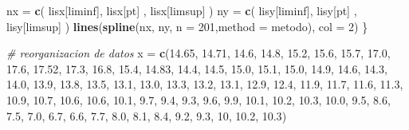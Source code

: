 \documentclass[]{article}
\newenvironment{Shaded}{\begin{snugshade}}{\end{snugshade}}
\newcommand{\KeywordTok}[1]{\textcolor[rgb]{0.13,0.29,0.53}{\textbf{#1}}}
\newcommand{\DataTypeTok}[1]{\textcolor[rgb]{0.13,0.29,0.53}{#1}}
\newcommand{\DecValTok}[1]{\textcolor[rgb]{0.00,0.00,0.81}{#1}}
\newcommand{\FloatTok}[1]{\textcolor[rgb]{0.00,0.00,0.81}{#1}}
\newcommand{\StringTok}[1]{\textcolor[rgb]{0.31,0.60,0.02}{#1}}
\newcommand{\CommentTok}[1]{\textcolor[rgb]{0.56,0.35,0.01}{\textit{#1}}}
\newcommand{\NormalTok}[1]{#1}
\begin{document}
\begin{Shaded}
\begin{Highlighting}[]
\NormalTok{  nx =}\StringTok{ }\KeywordTok{c}\NormalTok{( lisx[liminf], lisx[pt] , lisx[limsup]  )}
\NormalTok{  ny =}\StringTok{ }\KeywordTok{c}\NormalTok{( lisy[liminf], lisy[pt] , lisy[limsup]  )}
  \KeywordTok{lines}\NormalTok{(}\KeywordTok{spline}\NormalTok{(nx, ny, }\DataTypeTok{n =} \DecValTok{201}\NormalTok{,}\DataTypeTok{method =}\NormalTok{ metodo), }\DataTypeTok{col =} \DecValTok{2}\NormalTok{)}
\NormalTok{\}}

\CommentTok{# reorganizacion de datos }
\NormalTok{x =}\StringTok{ }\KeywordTok{c}\NormalTok{(}\FloatTok{14.65}\NormalTok{, }\FloatTok{14.71}\NormalTok{, }\FloatTok{14.6}\NormalTok{, }\FloatTok{14.8}\NormalTok{, }\FloatTok{15.2}\NormalTok{, }\FloatTok{15.6}\NormalTok{, }\FloatTok{15.7}\NormalTok{, }\FloatTok{17.0}\NormalTok{, }\FloatTok{17.6}\NormalTok{, }\FloatTok{17.52}\NormalTok{, }\FloatTok{17.3}\NormalTok{, }
  \FloatTok{16.8}\NormalTok{, }\FloatTok{15.4}\NormalTok{, }\FloatTok{14.83}\NormalTok{, }\FloatTok{14.4}\NormalTok{, }\FloatTok{14.5}\NormalTok{, }
  \FloatTok{15.0}\NormalTok{, }\FloatTok{15.1}\NormalTok{, }\FloatTok{15.0}\NormalTok{, }\FloatTok{14.9}\NormalTok{, }\FloatTok{14.6}\NormalTok{, }\FloatTok{14.3}\NormalTok{, }\FloatTok{14.0}\NormalTok{, }\FloatTok{13.9}\NormalTok{, }\FloatTok{13.8}\NormalTok{, }\FloatTok{13.5}\NormalTok{, }\FloatTok{13.1}\NormalTok{, }\FloatTok{13.0}\NormalTok{, }
  \FloatTok{13.3}\NormalTok{, }\FloatTok{13.2}\NormalTok{, }\FloatTok{13.1}\NormalTok{, }\FloatTok{12.9}\NormalTok{, }\FloatTok{12.4}\NormalTok{, }\FloatTok{11.9}\NormalTok{, }\FloatTok{11.7}\NormalTok{, }\FloatTok{11.6}\NormalTok{, }\FloatTok{11.3}\NormalTok{, }\FloatTok{10.9}\NormalTok{, }
  \FloatTok{10.7}\NormalTok{, }\FloatTok{10.6}\NormalTok{, }\FloatTok{10.6}\NormalTok{, }\FloatTok{10.1}\NormalTok{, }\FloatTok{9.7}\NormalTok{, }\FloatTok{9.4}\NormalTok{, }\FloatTok{9.3}\NormalTok{, }\FloatTok{9.6}\NormalTok{, }\FloatTok{9.9}\NormalTok{, }\FloatTok{10.1}\NormalTok{, }\FloatTok{10.2}\NormalTok{, }\FloatTok{10.3}\NormalTok{,  }\FloatTok{10.0}\NormalTok{, }\FloatTok{9.5}\NormalTok{, }
  \FloatTok{8.6}\NormalTok{, }\FloatTok{7.5}\NormalTok{, }\FloatTok{7.0}\NormalTok{, }\FloatTok{6.7}\NormalTok{, }\FloatTok{6.6}\NormalTok{, }\FloatTok{7.7}\NormalTok{, }
  \FloatTok{8.0}\NormalTok{, }\FloatTok{8.1}\NormalTok{, }\FloatTok{8.4}\NormalTok{, }\FloatTok{9.2}\NormalTok{, }\FloatTok{9.3}\NormalTok{, }\DecValTok{10}\NormalTok{, }\FloatTok{10.2}\NormalTok{, }\FloatTok{10.3}\NormalTok{)}


\end{Highlighting}
\end{Shaded}
\end{document}

